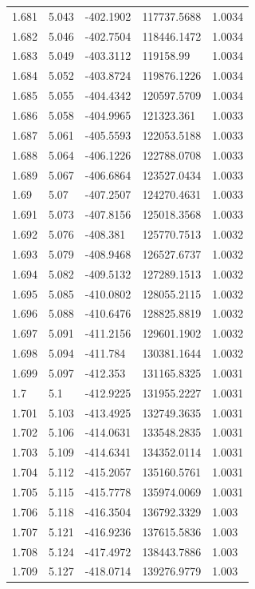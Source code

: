 \begin{tabular}{lllll}
1.681 & 5.043 & -402.1902 & 117737.5688 & 1.0034 \\
1.682 & 5.046 & -402.7504 & 118446.1472 & 1.0034 \\
1.683 & 5.049 & -403.3112 & 119158.99 & 1.0034 \\
1.684 & 5.052 & -403.8724 & 119876.1226 & 1.0034 \\
1.685 & 5.055 & -404.4342 & 120597.5709 & 1.0034 \\
1.686 & 5.058 & -404.9965 & 121323.361 & 1.0033 \\
1.687 & 5.061 & -405.5593 & 122053.5188 & 1.0033 \\
1.688 & 5.064 & -406.1226 & 122788.0708 & 1.0033 \\
1.689 & 5.067 & -406.6864 & 123527.0434 & 1.0033 \\
1.69 & 5.07 & -407.2507 & 124270.4631 & 1.0033 \\
1.691 & 5.073 & -407.8156 & 125018.3568 & 1.0033 \\
1.692 & 5.076 & -408.381 & 125770.7513 & 1.0032 \\
1.693 & 5.079 & -408.9468 & 126527.6737 & 1.0032 \\
1.694 & 5.082 & -409.5132 & 127289.1513 & 1.0032 \\
1.695 & 5.085 & -410.0802 & 128055.2115 & 1.0032 \\
1.696 & 5.088 & -410.6476 & 128825.8819 & 1.0032 \\
1.697 & 5.091 & -411.2156 & 129601.1902 & 1.0032 \\
1.698 & 5.094 & -411.784 & 130381.1644 & 1.0032 \\
1.699 & 5.097 & -412.353 & 131165.8325 & 1.0031 \\
1.7 & 5.1 & -412.9225 & 131955.2227 & 1.0031 \\
1.701 & 5.103 & -413.4925 & 132749.3635 & 1.0031 \\
1.702 & 5.106 & -414.0631 & 133548.2835 & 1.0031 \\
1.703 & 5.109 & -414.6341 & 134352.0114 & 1.0031 \\
1.704 & 5.112 & -415.2057 & 135160.5761 & 1.0031 \\
1.705 & 5.115 & -415.7778 & 135974.0069 & 1.0031 \\
1.706 & 5.118 & -416.3504 & 136792.3329 & 1.003 \\
1.707 & 5.121 & -416.9236 & 137615.5836 & 1.003 \\
1.708 & 5.124 & -417.4972 & 138443.7886 & 1.003 \\
1.709 & 5.127 & -418.0714 & 139276.9779 & 1.003 \\

\end{tabular}
